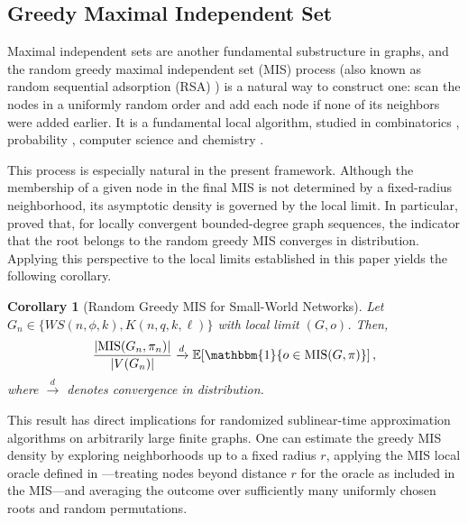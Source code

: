\documentclass[10pt]{amsart}
\newtheorem{corollary}[theorem]{Corollary}
\begin{document}
\subsection{Greedy Maximal Independent Set}

Maximal independent sets are another fundamental  substructure in graphs, and the random greedy maximal independent set (MIS) process (also known as random sequential adsorption (RSA)  \cite{flory}) is a natural way to construct one: scan the nodes in a uniformly random order and add each node if none of its neighbors were added earlier. It is a fundamental local algorithm, studied in combinatorics  \cite{Nicholas}, probability \cite{Rahman}, computer science \cite{Fischer} and chemistry \cite{flory}. 

This process is especially natural in the present framework. Although the membership of a given node in the final MIS is not determined by a fixed-radius neighborhood, its asymptotic density is governed by the local limit. In particular, \cite{krivelevich2024rsa} proved that, for locally convergent bounded-degree graph sequences, the indicator that the root belongs to the random greedy MIS converges in distribution. Applying this perspective to the local limits established in this paper yields the following corollary.

\begin{corollary}[Random Greedy MIS for Small-World Networks]
Let $G_n\!\in\!\{WS(n,\phi,k),K(n,q,k,\ell)\}$ with local limit $(G, o)$.  
Then,
\[
\frac{|\mathrm{MIS}(G_n,\pi_n)|}{|V(G_n)|}\xrightarrow{d}\mathbb{E}\!\left[\mathbbm{1}\{o \in\mathrm{MIS}(G,\pi)\}\right],
\]
where $\xrightarrow{d}$ denotes convergence in distribution.
\end{corollary}
This result has direct implications for randomized sublinear-time approximation algorithms on arbitrarily large finite graphs. One can estimate the greedy MIS density by exploring neighborhoods up to a fixed radius $r$, applying the MIS local oracle defined in  \cite{yoshida}---treating nodes beyond distance $r$ for the oracle as included in the MIS---and averaging the outcome over sufficiently many uniformly chosen roots and random permutations.


\end{document}

